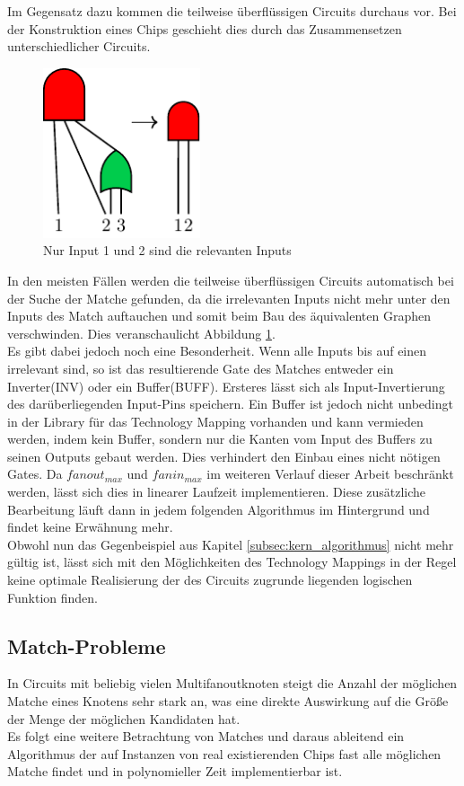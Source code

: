 \documentclass[11pt, a4paper, german]{article}
\newcommand{\TM}{Technology  Mapping }
\begin{document}
Im Gegensatz dazu kommen die teilweise überflüssigen Circuits durchaus vor. Bei der Konstruktion eines Chips geschieht dies durch das Zusammensetzen unterschiedlicher Circuits.\\
 \begin{figure}
		\includegraphics[height = 5cm]{pictures/compiled/partly_redundant}
		\caption{Nur Input 1 und 2 sind die relevanten Inputs}
		\label{bild:partly_redundant}
\end{figure}
In den meisten Fällen werden die teilweise überflüssigen Circuits automatisch bei der  Suche der Matche gefunden, da die irrelevanten Inputs nicht mehr unter den Inputs des Match auftauchen und somit beim Bau des äquivalenten Graphen verschwinden. Dies veranschaulicht Abbildung \ref{bild:partly_redundant}. \\
Es gibt dabei jedoch noch eine Besonderheit. Wenn alle Inputs bis auf einen irrelevant sind, so ist das resultierende Gate des Matches entweder ein Inverter(INV) oder ein Buffer(BUFF). Ersteres lässt sich als Input-Invertierung des darüberliegenden Input-Pins speichern. Ein Buffer ist jedoch nicht unbedingt in der Library für das \TM vorhanden und kann vermieden werden, indem kein Buffer, sondern nur die Kanten vom Input des Buffers zu seinen Outputs gebaut werden. Dies verhindert den Einbau eines nicht nötigen Gates. Da $fanout_{max}$ und $fanin_{max}$ im weiteren Verlauf dieser Arbeit beschränkt werden, lässt sich dies in linearer Laufzeit implementieren. Diese zusätzliche Bearbeitung läuft dann in jedem folgenden Algorithmus im Hintergrund und findet keine Erwähnung mehr.\\
 Obwohl nun das Gegenbeispiel aus Kapitel \ref{subsec:kern_algorithmus} nicht mehr gültig ist, lässt sich mit den Möglichkeiten des Technology Mappings in der Regel keine optimale Realisierung der des Circuits zugrunde liegenden logischen Funktion finden.
 
 
\subsection{Match-Probleme}
\label{subsec:match_kandidaten}
In Circuits mit beliebig vielen Multifanoutknoten steigt die Anzahl der möglichen Matche eines Knotens sehr stark an, was eine direkte Auswirkung auf die Größe der Menge der möglichen Kandidaten hat. \\
Es folgt eine weitere Betrachtung von Matches und daraus ableitend ein Algorithmus der auf Instanzen von real existierenden Chips fast alle möglichen Matche findet und in polynomieller Zeit implementierbar ist.
\end{document}

